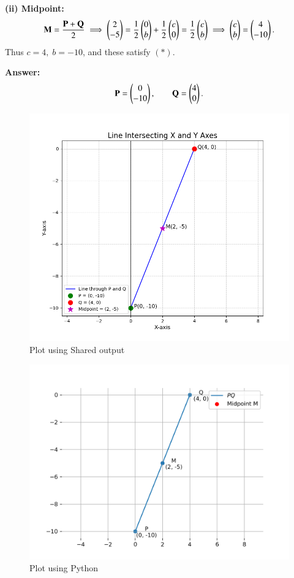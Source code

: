 \documentclass[journal]{IEEEtran}
\begin{document}
\textbf{(ii) Midpoint: }
\begin{align*}
\mathbf M=\frac{\mathbf P+\mathbf Q}{2}
\;\Longrightarrow\;
\begin{pmatrix}2\\ -5\end{pmatrix}
=\frac{1}{2}\begin{pmatrix}0\\ b\end{pmatrix}+\frac{1}{2}\begin{pmatrix}c\\ 0\end{pmatrix}
=\frac{1}{2}\begin{pmatrix}c\\ b\end{pmatrix}
\;\Longrightarrow\;
\begin{pmatrix}c\\ b\end{pmatrix}=\begin{pmatrix}4\\ -10\end{pmatrix}.
\end{align*}
Thus \(c=4,\; b=-10\), and these satisfy \((*)\).

\textbf{Answer: }
\[
\mathbf P=\begin{pmatrix}0\\ -10\end{pmatrix},\qquad
\mathbf Q=\begin{pmatrix}4\\ 0\end{pmatrix}.
\]
\begin{figure}[h!]
    \centering
    \includegraphics[width=0.6\columnwidth]{figs/Figure_1.png}
    \caption{Plot using Shared output}
\end{figure}

\begin{figure}[h!]
    \centering
    \includegraphics[width=0.6\columnwidth]{figs/fig.png}
    \caption{Plot using Python}
\end{figure}
\end{document}
